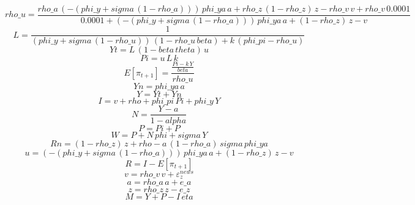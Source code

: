 \begin{dmath}
{rho\_u}=\frac{{rho\_a}\, \left(-\left({phi\_y}+{sigma}\, \left(1-{rho\_a}\right)\right)\right)\, {phi\_ya}\, {a}+{rho\_z}\, \left(1-{rho\_z}\right)\, {z}-{rho\_v}\, {v}+{rho\_v}\, 0.0001}{0.0001+\left(-\left({phi\_y}+{sigma}\, \left(1-{rho\_a}\right)\right)\right)\, {phi\_ya}\, {a}+\left(1-{rho\_z}\right)\, {z}-{v}}
\end{dmath}
\begin{dmath}
{L}=\frac{1}{\left({phi\_y}+{sigma}\, \left(1-{rho\_u}\right)\right)\, \left(1-{rho\_u}\, {beta}\right)+{k}\, \left({phi\_pi}-{rho\_u}\right)}
\end{dmath}
\begin{dmath}
{Yt}={L}\, \left(1-{beta}\, {theta}\right)\, {u}
\end{dmath}
\begin{dmath}
{Pi}={u}\, {L}\, {k}
\end{dmath}
\begin{dmath}
{{E[\pi_{t+1}]}}=\frac{\frac{{Pi}-{k}\, {Y}}{{beta}}}{{rho\_u}}
\end{dmath}
\begin{dmath}
{Yn}={phi\_ya}\, {a}
\end{dmath}
\begin{dmath}
{Y}={Yt}+{Yn}
\end{dmath}
\begin{dmath}
{I}={v}+{rho}+{phi\_pi}\, {Pi}+{phi\_y}\, {Y}
\end{dmath}
\begin{dmath}
{N}=\frac{{Y}-{a}}{1-{alpha}}
\end{dmath}
\begin{dmath}
{P}={Pi}+{P}
\end{dmath}
\begin{dmath}
{W}={P}+{N}\, {phi}+{sigma}\, {Y}
\end{dmath}
\begin{dmath}
{Rn}=\left(1-{rho\_z}\right)\, {z}+{rho}-{a}\, \left(1-{rho\_a}\right)\, {sigma}\, {phi\_ya}
\end{dmath}
\begin{dmath}
{u}=\left(-\left({phi\_y}+{sigma}\, \left(1-{rho\_a}\right)\right)\right)\, {phi\_ya}\, {a}+\left(1-{rho\_z}\right)\, {z}-{v}
\end{dmath}
\begin{dmath}
{R}={I}-{{E[\pi_{t+1}]}}
\end{dmath}
\begin{dmath}
{v}={rho\_v}\, {v}+{{\varepsilon_z^{news}}}
\end{dmath}
\begin{dmath}
{a}={rho\_a}\, {a}+{e\_a}
\end{dmath}
\begin{dmath}
{z}={rho\_z}\, {z}-{e\_z}
\end{dmath}
\begin{dmath}
{M}={Y}+{P}-{I}\, {eta}
\end{dmath}
